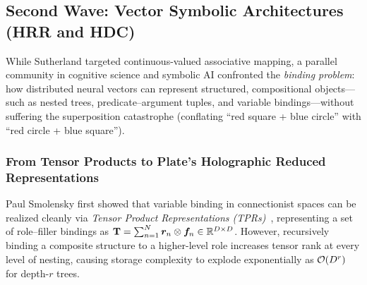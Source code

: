 \subsection{Second Wave: Vector Symbolic Architectures (HRR and HDC)}\label{sec:history:vsa}

While Sutherland targeted continuous-valued associative mapping, a parallel community in cognitive science and symbolic AI confronted the \emph{binding problem}: how distributed neural vectors can represent structured, compositional objects---such as nested trees, predicate--argument tuples, and variable bindings---without suffering the superposition catastrophe (conflating ``red square + blue circle'' with ``red circle + blue square'').

\subsubsection{From Tensor Products to Plate's Holographic Reduced Representations}

Paul Smolensky first showed that variable binding in connectionist spaces can be realized cleanly via \emph{Tensor Product Representations (TPRs)}~\cite{SMOLENSKY_1990_TPR}, representing a set of role--filler bindings as $\mathbf{T} = \sum_{n=1}^{N} \boldsymbol{r}_n \otimes \boldsymbol{f}_n \in \mathbb{R}^{D \times D}$.
However, recursively binding a composite structure to a higher-level role increases tensor rank at every level of nesting, causing storage complexity to explode exponentially as $\mathcal{O}\!\left(D^r\right)$ for depth-$r$ trees.

